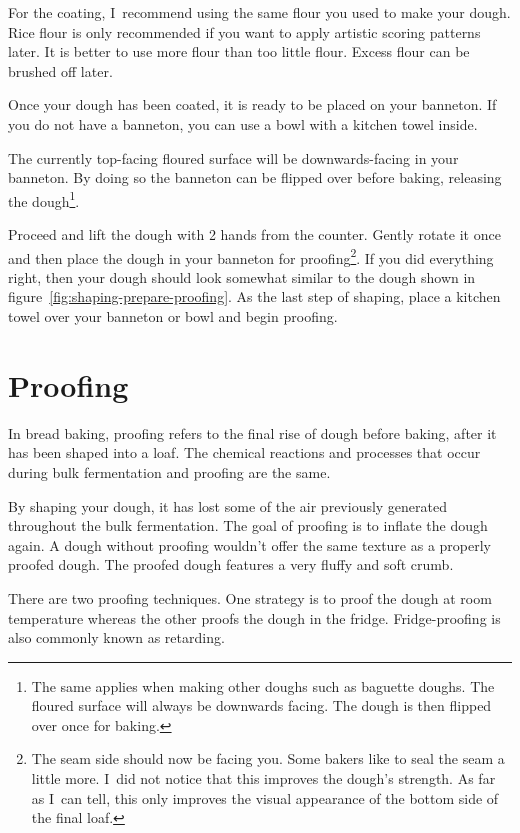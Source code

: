 For the coating, I~recommend using the same flour you used
to make your dough. Rice flour is only recommended if you
want to apply artistic scoring patterns later. It is better
to use more flour than too little flour. Excess flour can be
brushed off later.

Once your dough has been coated, it is ready to be placed on your banneton.
If you do not have a banneton, you can use a bowl
with a kitchen towel inside.

The currently top-facing floured surface will be downwards-facing in your banneton.
By doing so the banneton can be flipped
over before baking, releasing the dough\footnote{The same
applies when making other doughs such as baguette doughs. The floured
surface will always be downwards facing. The dough is then flipped over
once for baking.}.

Proceed and lift the dough with 2 hands from the counter.
Gently rotate it once and then place the dough in your
banneton for proofing\footnote{The seam side should now be facing you.
Some bakers like to seal the seam a little more. I~did
not notice that this improves the dough's strength. As far as I~can
tell, this only improves the visual appearance of the bottom side
of the final loaf.}. If you did everything right, then your
dough should look somewhat similar to the dough shown in figure~\ref{fig:shaping-prepare-proofing}.
As the last step of shaping, place a kitchen towel over your banneton
or bowl and begin proofing.

\section{Proofing}

In bread baking, proofing refers to the final rise of dough before baking,
after it has been shaped into a loaf. The chemical reactions and processes
that occur during bulk fermentation and proofing are the same.

By shaping your dough, it has lost some of the air previously generated
throughout the bulk fermentation. The goal of proofing is to inflate
the dough again. A dough without proofing wouldn't offer the same texture
as a properly proofed dough. The proofed dough features a very fluffy
and soft crumb.

There are two proofing techniques. One strategy is to proof the dough
at room temperature whereas the other proofs the dough in the fridge.
Fridge-proofing is also commonly known as retarding.

